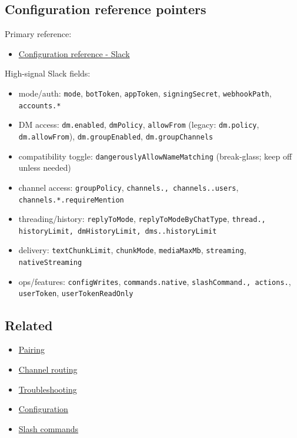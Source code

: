 \subsection{Configuration reference pointers}


Primary reference:

\begin{itemize}
  \item \href{/gateway/configuration-reference\#slack}{Configuration reference - Slack}
\end{itemize}


High-signal Slack fields:
\begin{itemize}
  \item mode/auth: \texttt{mode}, \texttt{botToken}, \texttt{appToken}, \texttt{signingSecret}, \texttt{webhookPath}, \texttt{accounts.*}
  \item DM access: \texttt{dm.enabled}, \texttt{dmPolicy}, \texttt{allowFrom} (legacy: \texttt{dm.policy}, \texttt{dm.allowFrom}), \texttt{dm.groupEnabled}, \texttt{dm.groupChannels}
  \item compatibility toggle: \texttt{dangerouslyAllowNameMatching} (break-glass; keep off unless needed)
  \item channel access: \texttt{groupPolicy}, \texttt{channels.\textit{}, \texttt{channels.}.users}, \texttt{channels.*.requireMention}
  \item threading/history: \texttt{replyToMode}, \texttt{replyToModeByChatType}, \texttt{thread.\textit{}, \texttt{historyLimit}, \texttt{dmHistoryLimit}, \texttt{dms.}.historyLimit}
  \item delivery: \texttt{textChunkLimit}, \texttt{chunkMode}, \texttt{mediaMaxMb}, \texttt{streaming}, \texttt{nativeStreaming}
  \item ops/features: \texttt{configWrites}, \texttt{commands.native}, \texttt{slashCommand.\textit{}, \texttt{actions.}}, \texttt{userToken}, \texttt{userTokenReadOnly}
\end{itemize}


\subsection{Related}


\begin{itemize}
  \item \href{/channels/pairing}{Pairing}
  \item \href{/channels/channel-routing}{Channel routing}
  \item \href{/channels/troubleshooting}{Troubleshooting}
  \item \href{/gateway/configuration}{Configuration}
  \item \href{/tools/slash-commands}{Slash commands}
\end{itemize}



